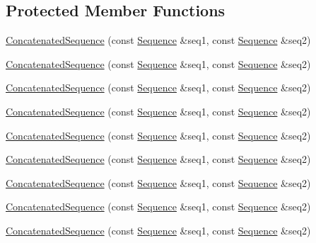 \subsection*{Protected Member Functions}
\begin{DoxyCompactItemize}
\item 
\mbox{\hyperlink{classfakeit_1_1ConcatenatedSequence_abd7ca3783b69358f0ff4c15b970b01d0}{Concatenated\+Sequence}} (const \mbox{\hyperlink{classfakeit_1_1Sequence}{Sequence}} \&seq1, const \mbox{\hyperlink{classfakeit_1_1Sequence}{Sequence}} \&seq2)
\item 
\mbox{\hyperlink{classfakeit_1_1ConcatenatedSequence_abd7ca3783b69358f0ff4c15b970b01d0}{Concatenated\+Sequence}} (const \mbox{\hyperlink{classfakeit_1_1Sequence}{Sequence}} \&seq1, const \mbox{\hyperlink{classfakeit_1_1Sequence}{Sequence}} \&seq2)
\item 
\mbox{\hyperlink{classfakeit_1_1ConcatenatedSequence_abd7ca3783b69358f0ff4c15b970b01d0}{Concatenated\+Sequence}} (const \mbox{\hyperlink{classfakeit_1_1Sequence}{Sequence}} \&seq1, const \mbox{\hyperlink{classfakeit_1_1Sequence}{Sequence}} \&seq2)
\item 
\mbox{\hyperlink{classfakeit_1_1ConcatenatedSequence_abd7ca3783b69358f0ff4c15b970b01d0}{Concatenated\+Sequence}} (const \mbox{\hyperlink{classfakeit_1_1Sequence}{Sequence}} \&seq1, const \mbox{\hyperlink{classfakeit_1_1Sequence}{Sequence}} \&seq2)
\item 
\mbox{\hyperlink{classfakeit_1_1ConcatenatedSequence_abd7ca3783b69358f0ff4c15b970b01d0}{Concatenated\+Sequence}} (const \mbox{\hyperlink{classfakeit_1_1Sequence}{Sequence}} \&seq1, const \mbox{\hyperlink{classfakeit_1_1Sequence}{Sequence}} \&seq2)
\item 
\mbox{\hyperlink{classfakeit_1_1ConcatenatedSequence_abd7ca3783b69358f0ff4c15b970b01d0}{Concatenated\+Sequence}} (const \mbox{\hyperlink{classfakeit_1_1Sequence}{Sequence}} \&seq1, const \mbox{\hyperlink{classfakeit_1_1Sequence}{Sequence}} \&seq2)
\item 
\mbox{\hyperlink{classfakeit_1_1ConcatenatedSequence_abd7ca3783b69358f0ff4c15b970b01d0}{Concatenated\+Sequence}} (const \mbox{\hyperlink{classfakeit_1_1Sequence}{Sequence}} \&seq1, const \mbox{\hyperlink{classfakeit_1_1Sequence}{Sequence}} \&seq2)
\item 
\mbox{\hyperlink{classfakeit_1_1ConcatenatedSequence_abd7ca3783b69358f0ff4c15b970b01d0}{Concatenated\+Sequence}} (const \mbox{\hyperlink{classfakeit_1_1Sequence}{Sequence}} \&seq1, const \mbox{\hyperlink{classfakeit_1_1Sequence}{Sequence}} \&seq2)
\item 
\mbox{\hyperlink{classfakeit_1_1ConcatenatedSequence_abd7ca3783b69358f0ff4c15b970b01d0}{Concatenated\+Sequence}} (const \mbox{\hyperlink{classfakeit_1_1Sequence}{Sequence}} \&seq1, const \mbox{\hyperlink{classfakeit_1_1Sequence}{Sequence}} \&seq2)
\end{DoxyCompactItemize}

